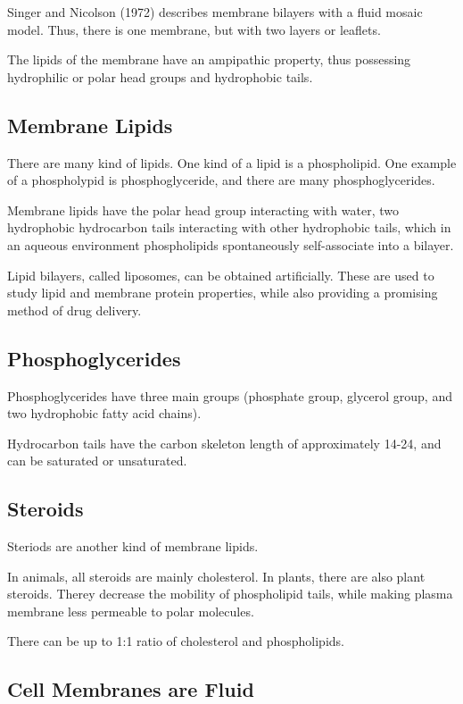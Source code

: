 \documentclass[11pt]{scrartcl}
\begin{document}
Singer and Nicolson (1972) describes membrane bilayers with a fluid mosaic model. Thus, there is one membrane, but with two layers or leaflets.

The lipids of the membrane have an ampipathic property, thus
possessing hydrophilic or polar head groups and hydrophobic tails.

\subsection{Membrane Lipids}

There are many kind of lipids. One kind of a lipid is a phospholipid. One example of a phospholypid is phosphoglyceride, and there are many phosphoglycerides.

Membrane lipids have the polar head group interacting with water, two hydrophobic hydrocarbon tails interacting with other hydrophobic tails, which in an aqueous environment phospholipids spontaneously self-associate into a bilayer.

Lipid bilayers, called liposomes, can be obtained artificially. These are used to study lipid and membrane protein properties, while also providing a promising method of drug delivery.

\subsection{Phosphoglycerides}

Phosphoglycerides have three main groups (phosphate group, glycerol group, and two hydrophobic fatty acid chains).

Hydrocarbon tails have the carbon skeleton length of approximately 14-24, and can be saturated or unsaturated.

\subsection{Steroids}

Steriods are another kind of membrane lipids.

In animals, all steroids are mainly cholesterol. In plants, there are
also plant steroids. Therey decrease the mobility of phospholipid
tails, while making plasma membrane less permeable to polar molecules.

There can be up to 1:1 ratio of cholesterol and phospholipids.

\subsection{Cell Membranes are Fluid}
\end{document}
